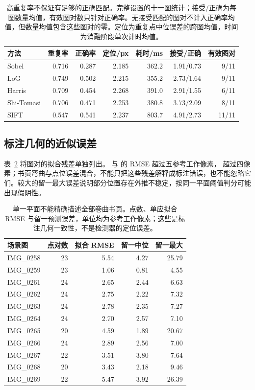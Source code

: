\begin{table}[H]
\centering\small
\caption{高重复率不保证有足够的正确匹配。完整设置的十一图统计；接受/正确为每图数量均值，有效图对数只针对正确率。无接受匹配的图对不计入正确率均值，但数量均值包含这些图对的零。定位为重复点中位误差的跨图均值，时间为消融阶段单次计时均值。}
\label{tab:real-full}
\setlength{\tabcolsep}{4pt}
\begin{tabular}{lrrrrrr}
\toprule
方法 & 重复率 & 正确率 & 定位/px & 耗时/ms & 接受/正确 & 有效图对\\
\midrule
Sobel & 0.716 & 0.287 & 2.185 & 362.2 & 1.91/0.73 & 9/11\\
LoG & 0.749 & 0.502 & 2.215 & 355.2 & 2.73/1.64 & 9/11\\
Harris & 0.709 & 0.454 & 2.268 & 391.0 & 2.91/1.55 & 6/11\\
Shi-Tomasi & 0.706 & 0.471 & 2.253 & 380.8 & 3.73/2.09 & 8/11\\
SIFT & 0.547 & 0.541 & 2.237 & 803.7 & 4.91/2.73 & 11/11\\
\bottomrule
\end{tabular}
\end{table}

\clearpage
\subsection{标注几何的近似误差}
表~\ref{tab:real-geometry} 将图对的拟合残差单独列出。 与  的 RMSE 超过五参考工作像素， 超过四像素；书页弯曲与点位误差混合，不能只把这些残差解释成标注错误，也不能忽略它们。较大的留一最大误差说明部分位置存在外推不稳定，按同一平面阈值判分可能出现假阴性。

\begin{table}[H]
\centering\small
\caption{单一平面不能精确描述全部卷曲书页。点数、单应拟合 RMSE 与留一预测误差，单位均为参考工作像素；这些是标注几何一致性，不是检测器的定位误差。}
\label{tab:real-geometry}
\begin{tabular}{lrrrr}
\toprule
场景图 & 点对数 & 拟合 RMSE & 留一中位 & 留一最大\\
\midrule
IMG\_0258 & 23 & 5.54 & 4.27 & 25.79\\
IMG\_0259 & 23 & 1.06 & 0.81 & 4.55\\
IMG\_0261 & 24 & 2.65 & 2.44 & 6.63\\
IMG\_0262 & 24 & 2.75 & 2.22 & 7.32\\
IMG\_0263 & 24 & 2.78 & 2.35 & 7.27\\
IMG\_0264 & 24 & 2.70 & 2.57 & 7.10\\
IMG\_0265 & 20 & 4.59 & 1.89 & 20.67\\
IMG\_0266 & 24 & 2.89 & 2.56 & 7.00\\
IMG\_0267 & 22 & 3.51 & 3.80 & 7.64\\
IMG\_0268 & 20 & 3.43 & 2.18 & 9.46\\
IMG\_0269 & 22 & 5.47 & 3.92 & 26.39\\
\bottomrule
\end{tabular}
\end{table}


